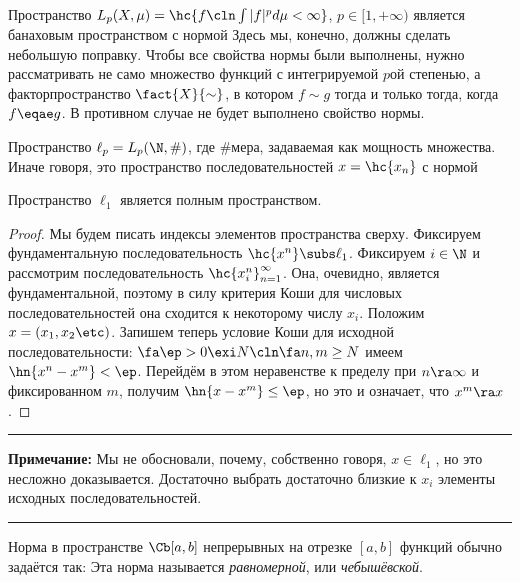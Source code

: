 \documentclass[a4paper]{article}
\newcommand{\seq}[3]{\hc{#1}_{{#2}}^{{#3}}}
\newcommand{\comment}[1]{\par\vskip2pt\hrule\vskip2pt{\footnotesize \textbf{Примечание:} #1\par}\vskip2pt\hrule\vskip2pt}
\begin{document}
\begin{ex}
Пространство $L_p(X, \mu) = \hc{f\cln \int|f|^p d\mu < \infty}$, $p \in [1, +\infty)$
является банаховым пространством с нормой
Здесь мы, конечно, должны сделать небольшую поправку. Чтобы все свойства нормы были выполнены,
нужно рассматривать не само множество функций с интегрируемой $p$\д ой степенью, а
факторпространство $\fact{X}{\sim}$, в котором $f \sim g$ тогда и только тогда, когда $f \eqae g$.
В противном случае не будет выполнено свойство  нормы.
\end{ex}

\begin{ex}
Пространство $\ell_p = L_p(\N, \#)$, где $\#$\т мера, задаваемая как мощность множества.
Иначе говоря, это пространство последовательностей $x = \hc{x_n}$ с нормой
\end{ex}

\begin{theorem}
Пространство $\ell_1$ является полным пространством.
\end{theorem}
\begin{proof}
Мы будем писать индексы элементов пространства сверху.
Фиксируем фундаментальную последовательность $\hc{x^n} \subs \ell_1$. Фиксируем $i \in \N$
и рассмотрим последовательность $\seq{x_i^n}{n=1}{\infty}$. Она, очевидно, является фундаментальной,
поэтому в силу критерия Коши для числовых последовательностей она сходится к некоторому
числу $x_i$. Положим $x = (x_1,x_2\etc)$. Запишем теперь условие Коши для исходной
последовательности: $\fa \ep > 0 \exi N\cln \fa n,m \ge N$ имеем $\hn{x^n - x^m} < \ep$.
Перейдём в этом неравенстве к пределу при $n \ra \infty$ и фиксированном $m$, получим
$\hn{x - x^m} \le \ep$, но это и означает, что $x^m \ra x$.
\end{proof}
\comment{Мы не обосновали, почему, собственно говоря, $x \in \ell_1$, но это несложно доказывается.
Достаточно выбрать достаточно близкие к $x_i$ элементы исходных последовательностей.}

\begin{df}
Норма в пространстве $\Cb[a,b]$ непрерывных на отрезке $[a,b]$ функций
обычно задаётся так:
Эта норма называется \emph{равномерной}, или \emph{чебышёвской}.
\end{df}
\end{document}

